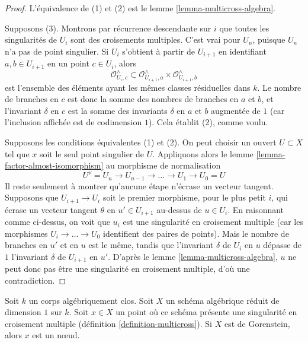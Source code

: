 \begin{proof}
L'équivalence de (1) et (2) est le lemme \ref{lemma-multicross-algebra}.

\medskip\noindent
Supposons (3). Montrons par récurrence descendante sur $i$ que toutes les singularités de $U_i$ sont des croisements multiples. C'est vrai pour $U_n$, puisque $U_n$ n'a pas de point singulier. Si $U_i$ s'obtient à partir de $U_{i + 1}$ en identifiant $a, b \in U_{i + 1}$ en un point $c \in U_i$, alors $$
\mathcal{O}_{U_i, c}^\wedge \subset
\mathcal{O}_{U_{i + 1}, a}^\wedge \times \mathcal{O}_{U_{i + 1}, b}^\wedge
$$ est l'ensemble des éléments ayant les mêmes classes résiduelles dans $k$. Le nombre de branches en $c$ est donc la somme des nombres de branches en $a$ et $b$, et l'invariant $\delta$ en $c$ est la somme des invariants $\delta$ en $a$ et $b$ augmentée de $1$ (car l'inclusion affichée est de codimension $1$). Cela établit (2), comme voulu.

\medskip\noindent
Supposons les conditions équivalentes (1) et (2). On peut choisir un ouvert $U \subset X$ tel que $x$ soit le seul point singulier de $U$. Appliquons alors le lemme \ref{lemma-factor-almost-isomorphism} au morphisme de normalisation $$
U^\nu = U_n \to U_{n - 1} \to \ldots \to U_1 \to U_0 = U
$$ Il reste seulement à montrer qu'aucune étape n'écrase un vecteur tangent. Supposons que $U_{i + 1} \to U_i$ soit le premier morphisme, pour le plus petit $i$, qui écrase un vecteur tangent $\theta$ en $u' \in U_{i + 1}$ au-dessus de $u \in U_i$. En raisonnant comme ci-dessus, on voit que $u_i$ est une singularité en croisement multiple (car les morphismes $U_i \to \ldots \to U_0$ identifient des paires de points). Mais le nombre de branches en $u'$ et en $u$ est le même, tandis que l'invariant $\delta$ de $U_i$ en $u$ dépasse de $1$ l'invariant $\delta$ de $U_{i + 1}$ en $u'$. D'après le lemme \ref{lemma-multicross-algebra}, $u$ ne peut donc pas être une singularité en croisement multiple, d'où une contradiction.
\end{proof}

\begin{lemma}
\label{lemma-multicross-gorenstein-is-nodal}
Soit $k$ un corps algébriquement clos. Soit $X$ un schéma algébrique réduit de dimension $1$ sur $k$. Soit $x \in X$ un point où ce schéma présente une singularité en croisement multiple (définition \ref{definition-multicross}). Si $X$ est de Gorenstein, alors $x$ est un nœud.
\end{lemma}

